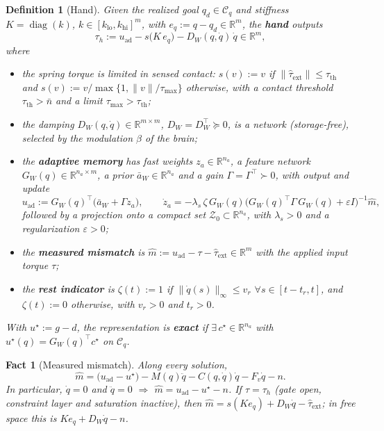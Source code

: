 \documentclass[11pt]{article}\usepackage[margin=1in]{geometry}\usepackage{amsmath,amssymb,amsthm,mathtools}\usepackage{graphicx}\graphicspath{{figures/}{../figures/}{figs/}{./}}\usepackage{enumitem}\usepackage{hyperref}\usepackage{cleveref}\usepackage{tikz}\usetikzlibrary{arrows.meta,positioning,calc,shapes.geometric}\usepackage{float}\usepackage{rotating}\usepackage[most]{tcolorbox}\usepackage{kotex}\usepackage{booktabs}\usepackage{longtable}\emergencystretch=1.6em\tolerance=2000 \crefname{assumption}{Assumption}{Assumptions}\Crefname{assumption}{Assumption}{Assumptions}\crefname{definition}{Definition}{Definitions}\Crefname{definition}{Definition}{Definitions}\crefname{proposition}{Proposition}{Propositions}\Crefname{proposition}{Proposition}{Propositions}\crefname{fact}{Fact}{Facts}\Crefname{fact}{Fact}{Facts} \newtheorem{assumption}{Assumption}\newtheorem{definition}{Definition}\newtheorem{lemma}{Lemma}\newtheorem{proposition}{Proposition}\newtheorem{theorem}{Theorem}\newtheorem{corollary}{Corollary}\newtheorem{fact}{Fact}\theoremstyle{remark}\newtheorem{remark}{Remark} \newcommand{\R}{\mathbb{R}}\newcommand{\xb}{\bar x}\newcommand{\Ab}{\bar A}\newcommand{\By}{\bar B_y}\newcommand{\U}{\mathcal U}\newcommand{\Z}{\mathcal Z}
\begin{document}
\begin{definition}[Hand]
\label{def:hand}
Given the realized goal $q_d\in\mathcal C_q$ and stiffness $K=\operatorname{diag}(k)$, $k\in[k_{\mathrm{lo}},k_{\mathrm{hi}}]^m$, with $e_q:=q-q_d\in\R^m$, the \textbf{\emph{hand}} outputs
\[
\tau_h:=u_{\mathrm{ad}}-s\big(K\,e_q\big)-D_W(q,\dot q)\,\dot q\in\R^m,
\]
where
\begin{itemize}
\item the spring torque is limited in sensed contact: $s(v):=v$ if $\|\hat\tau_{\mathrm{ext}}\|\le\tau_{\mathrm{th}}$ and $s(v):=v/\max\{1,\|v\|/\tau_{\max}\}$ otherwise, with a contact threshold $\tau_{\mathrm{th}}>\bar n$ and a limit $\tau_{\max}>\tau_{\mathrm{th}}$;
\item the damping $D_W(q,\dot q)\in\R^{m\times m}$, $D_W=D_W^\top\succeq0$, is a network (storage-free), selected by the modulation $\beta$ of the brain;
\item the \textbf{\emph{adaptive memory}} has fast weights $z_a\in\R^{n_a}$, a feature network $G_W(q)\in\R^{n_a\times m}$, a prior $\bar a_W\in\R^{n_a}$ and a gain $\Gamma=\Gamma^\top\succ0$, with output and update
\[
u_{\mathrm{ad}}:=G_W(q)^\top\big(\bar a_W+\Gamma z_a\big),\qquad \dot z_a=-\lambda_s\,\zeta\,G_W(q)\big(G_W(q)^\top\Gamma\,G_W(q)+\varepsilon I\big)^{-1}\hat m,
\]
followed by a projection onto a compact set $\mathcal Z_0\subset\R^{n_a}$, with $\lambda_s>0$ and a regularization $\varepsilon>0$;
\item the \textbf{\emph{measured mismatch}} is $\hat m:=u_{\mathrm{ad}}-\tau-\hat\tau_{\mathrm{ext}}\in\R^m$ with the applied input torque $\tau$;
\item the \textbf{\emph{rest indicator}} is $\zeta(t):=1$ if $\|\dot q(s)\|_\infty\le v_r$ $\forall s\in[t-t_r,t]$, and $\zeta(t):=0$ otherwise, with $v_r>0$ and $t_r>0$.
\end{itemize}
With $u^\star:=g-d$, the representation is \textbf{\emph{exact}} if $\exists\,c^\star\in\R^{n_a}$ with $u^\star(q)=G_W(q)^\top c^\star$ on $\mathcal C_q$.
\end{definition}

\begin{fact}[Measured mismatch]
\label{fact:mhat}
Along every solution,
\[
\hat m=\big(u_{\mathrm{ad}}-u^\star\big)-M(q)\ddot q-C(q,\dot q)\dot q-F_v\dot q-n .
\]
In particular, $\dot q=0$ and $\ddot q=0$ $\Rightarrow$ $\hat m=u_{\mathrm{ad}}-u^\star-n$. If $\tau=\tau_h$ (gate open, constraint layer and saturation inactive), then $\hat m=s(Ke_q)+D_W\dot q-\hat\tau_{\mathrm{ext}}$; in free space this is $Ke_q+D_W\dot q-n$.
\end{fact}
\end{document}
